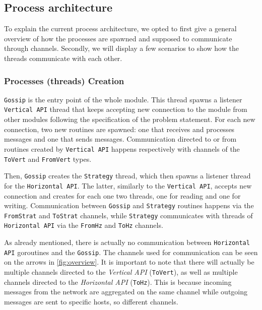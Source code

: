\documentclass[a4paper,english,10pt,NET]{tumarticle}
\begin{document}
\subsection{Process architecture} \label{sec:msgpassing}

To explain the current process architecture, we opted to first give a general overview of how the processes are spawned and supposed to communicate through channels. Secondly, we will display a few scenarios to show how the threads communicate with each other.

\subsubsection{Processes (threads) Creation} \label{process-creation}

\texttt{Gossip} is the entry point of the whole module. This thread spawns a listener \texttt{Vertical API} thread that keeps accepting new connection to the module from other modules following the specification of the problem statement. For each new connection, two new routines are spawned: one that receives and processes messages and one that sends messages. Communication directed to or from routines created by \texttt{Vertical API} happens respectively with channels of the \texttt{ToVert} and \texttt{FromVert} types.

Then, \texttt{Gossip} creates the \texttt{Strategy} thread, which then spawns a listener thread for the \texttt{Horizontal API}. The latter, similarly to the \texttt{Vertical API}, accepts new connection and creates for each one two threads, one for reading and one for writing. Communication between \texttt{Gossip} and \texttt{Strategy} routines happens via the \texttt{FromStrat} and \texttt{ToStrat} channels, while \texttt{Strategy} communicates with threads of \texttt{Horizontal API} via the \texttt{FromHz} and \texttt{ToHz} channels.

As already mentioned, there is actually no communication between \texttt{Horizontal API} goroutines and the \texttt{Gossip}. The channels used for communication can be seen on the arrows in \cref{fig:overview}. It is important to note that there will actually be multiple channels directed to the \textit{Vertical API} (\texttt{ToVert}), as well as multiple channels directed to the \textit{Horizontal API} (\texttt{ToHz}). This is because incoming messages from the network are aggregated on the same channel while outgoing messages are sent to specific hosts, so different channels.
\end{document}
